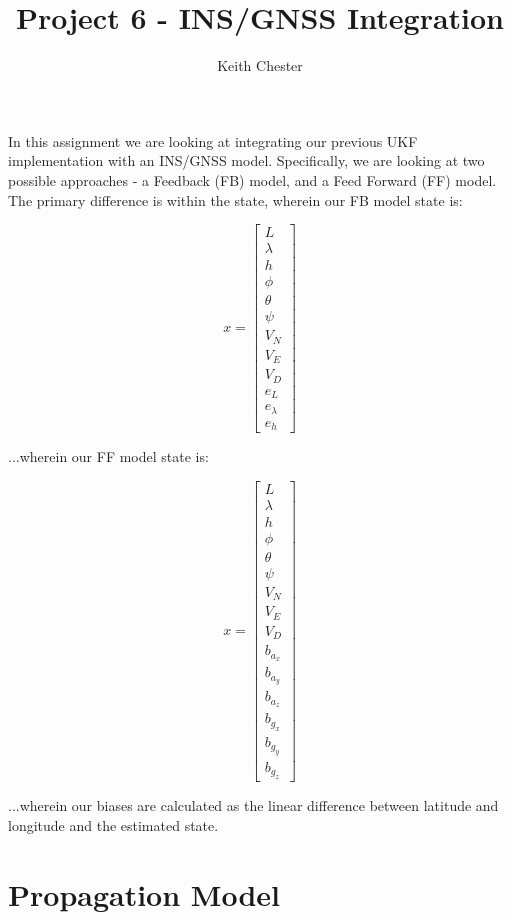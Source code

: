 \documentclass{article}
\title{Project 6 - INS/GNSS Integration}
\author{Keith Chester}
\begin{document}
\maketitle


In this assignment we are looking at integrating our previous UKF implementation with an INS/GNSS model. Specifically, we are looking at two possible approaches - a Feedback (FB) model, and a Feed Forward (FF) model. The primary difference is within the state, wherein our FB model state is:

\begin{equation}
    x = \begin{bmatrix} L \\ \lambda \\ h \\ \phi \\ \theta \\ \psi \\ V_N \\ V_E \\ V_D \\ e_L \\ e_\lambda \\ e_h \end{bmatrix}
\end{equation}

...wherein our FF model state is:

\begin{equation}
    x = \begin{bmatrix} L \\ \lambda \\ h \\ \phi \\ \theta \\ \psi \\ V_N \\ V_E \\ V_D \\ b_{a_x} \\ b_{a_y} \\ b_{a_z} \\ b_{g_x} \\ b_{g_y} \\ b_{g_z} \end{bmatrix}
\end{equation}

...wherein our biases are calculated as the linear difference between latitude and longitude and the estimated state.

\section*{Propagation Model}
\end{document}
